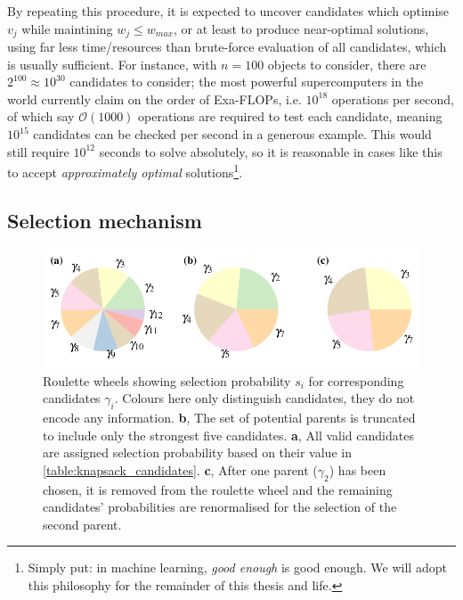 By repeating this procedure, it is expected to uncover candidates which optimise $v_j$ while maintining $w_j \leq w_{max}$, 
    or at least to produce near-optimal solutions, using far less time/resources than brute-force evaluation of all candidates, 
    which is usually sufficient. 
For instance, with $n=100$ objects to consider, there are $2^{100} \approx 10^{30}$ candidates to consider; 
    the most powerful supercomputers in the world currently claim on the order of Exa-FLOPs, 
    i.e. $10^{18}$ operations per second, of which say $\mathcal{O}(1000)$ operations are required to test each candidate, 
    meaning $10^{15}$ candidates can be checked per second in a generous example. 
This would still require $10^{12}$ seconds to solve absolutely, 
    so it is reasonable in cases like this to accept 
    \emph{approximately optimal} solutions\footnote{
        Simply put: in machine learning, \emph{good enough} is good enough.
        We will adopt this philosophy for the remainder of this thesis and life. 
    }. 


\subsection{Selection mechanism}
\begin{figure}
    \begin{center}
        \includegraphics{theoretical_study/figures/knapsack_roulette.pdf}
    \end{center}
    \caption[Roulette wheels for selection]{
        Roulette wheels showing selection probability $s_i$ for corresponding candidates $\gamma_i$. 
        Colours here only distinguish candidates, they do not encode any information. 
        \textbf{b}, The set of potential parents is truncated to include only the strongest five candidates. 
        \textbf{a}, All valid candidates are assigned selection probability based on their value in \cref{table:knapsack_candidates}. 
        \textbf{c}, After one parent ($\gamma_2$) has been chosen, it is removed from the roulette wheel and the remaining
         candidates' probabilities are renormalised for the selection of the second parent. 
    }
    \label{fig:knapsack_roulette}
\end{figure}

